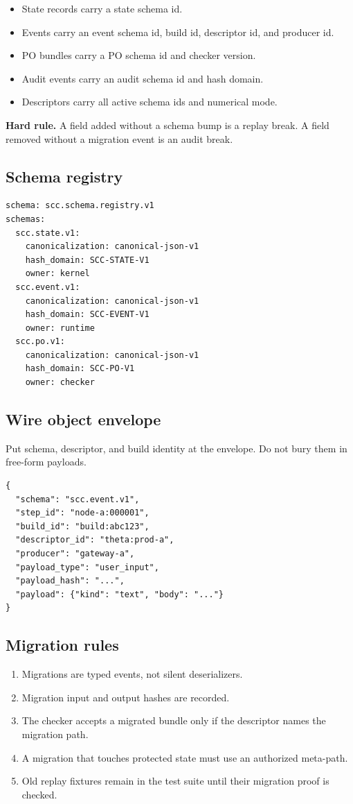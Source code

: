 \documentclass[11pt,oneside]{article}
\newenvironment{rulebox}{\begin{shaded}\noindent\textbf{Hard rule.} }{\end{shaded}}
\begin{document}
\begin{itemize}
\item State records carry a state schema id.
\item Events carry an event schema id, build id, descriptor id, and producer id.
\item PO bundles carry a PO schema id and checker version.
\item Audit events carry an audit schema id and hash domain.
\item Descriptors carry all active schema ids and numerical mode.
\end{itemize}

\begin{rulebox}
A field added without a schema bump is a replay break. A field removed without a migration event is an audit break.
\end{rulebox}

\subsection{Schema registry}
\begin{lstlisting}[caption={Minimal schema registry entry.}]
schema: scc.schema.registry.v1
schemas:
  scc.state.v1:
    canonicalization: canonical-json-v1
    hash_domain: SCC-STATE-V1
    owner: kernel
  scc.event.v1:
    canonicalization: canonical-json-v1
    hash_domain: SCC-EVENT-V1
    owner: runtime
  scc.po.v1:
    canonicalization: canonical-json-v1
    hash_domain: SCC-PO-V1
    owner: checker
\end{lstlisting}

\subsection{Wire object envelope}
Put schema, descriptor, and build identity at the envelope. Do not bury them in free-form payloads.

\begin{lstlisting}[caption={Canonical event envelope.}]
{
  "schema": "scc.event.v1",
  "step_id": "node-a:000001",
  "build_id": "build:abc123",
  "descriptor_id": "theta:prod-a",
  "producer": "gateway-a",
  "payload_type": "user_input",
  "payload_hash": "...",
  "payload": {"kind": "text", "body": "..."}
}
\end{lstlisting}

\subsection{Migration rules}
\begin{enumerate}
\item Migrations are typed events, not silent deserializers.
\item Migration input and output hashes are recorded.
\item The checker accepts a migrated bundle only if the descriptor names the migration path.
\item A migration that touches protected state must use an authorized meta-path.
\item Old replay fixtures remain in the test suite until their migration proof is checked.
\end{enumerate}
\end{document}
